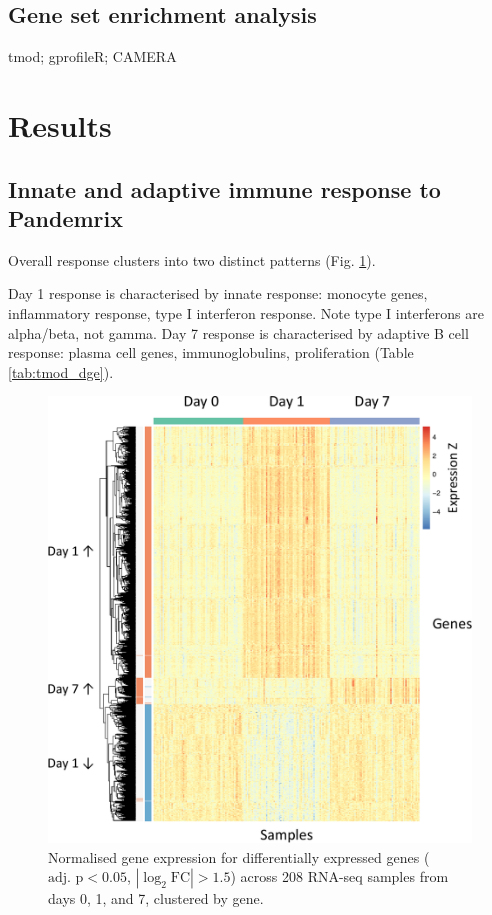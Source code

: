 \subsection{Gene set enrichment analysis}

tmod; gprofileR; CAMERA

\section{Results}

\subsection{Innate and adaptive immune response to Pandemrix}

Overall response clusters into two distinct patterns (Fig. \ref{fig:dge_heatmap}).

Day 1 response is characterised by innate response: monocyte genes, inflammatory response, type I interferon response.
Note type I interferons are alpha/beta, not gamma.
Day 7 response is characterised by adaptive B cell response: plasma cell genes, immunoglobulins, proliferation (Table \ref{tab:tmod_dge}).

\begin{figure}
    \includegraphics[width=1.0\textwidth]{./mainmatter/figures/chapter_02/graphics/plot_dge_eqtl.heatmap_dge.annotated-crop.pdf}
    \caption{Normalised gene expression for differentially expressed genes ($\text{adj. p} < 0.05$, $\left|\log_2\text{FC}\right| > 1.5$) across 208 RNA-seq samples from days 0, 1, and 7, clustered by gene.}
    \label{fig:dge_heatmap}
\end{figure}

